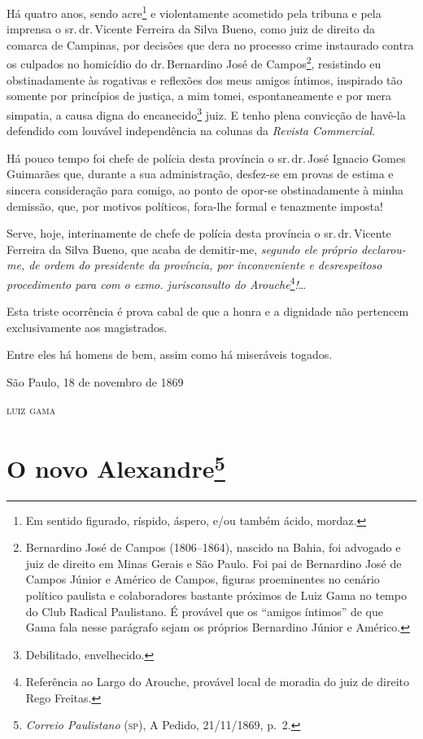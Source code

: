 Há quatro anos, sendo acre\footnote{Em sentido figurado, ríspido,
  áspero, e/ou também ácido, mordaz.} e violentamente acometido pela
tribuna e pela imprensa o sr.\,dr.\,Vicente Ferreira da Silva Bueno, como
juiz de direito da comarca de Campinas, por decisões que dera no
processo crime instaurado contra os culpados no homicídio do dr.\,Bernardino José de Campos\footnote{Bernardino José de Campos
  (1806--1864), nascido na Bahia, foi advogado e juiz de direito em Minas
  Gerais e São Paulo. Foi pai de Bernardino José de Campos Júnior e
  Américo de Campos, figuras proeminentes no cenário político paulista e
  colaboradores bastante próximos de Luiz Gama no tempo do Club Radical
  Paulistano. É provável que os ``amigos íntimos'' de que Gama fala nesse
  parágrafo sejam os próprios Bernardino Júnior e Américo.}, resistindo
eu obstinadamente às rogativas e reflexões dos meus amigos íntimos,
inspirado tão somente por princípios de justiça, a mim tomei,
espontaneamente e por mera simpatia, a causa digna do
encanecido\footnote{Debilitado, envelhecido.} juiz. E tenho plena
convicção de havê-la defendido com louvável independência na colunas da
\emph{Revista Commercial}.

Há pouco tempo foi chefe de polícia desta província o sr.\,dr.\,José
Ignacio Gomes Guimarães que, durante a sua administração, desfez-se em
provas de estima e sincera consideração para comigo, ao ponto de opor-se
obstinadamente à minha demissão, que, por motivos políticos, fora-lhe
formal e tenazmente imposta!

Serve, hoje, interinamente de chefe de polícia desta província o sr.\,dr.\,Vicente Ferreira da Silva Bueno, que acaba de demitir-me, \emph{segundo
ele próprio declarou-me, de ordem do presidente da província, por
inconveniente e desrespeitoso procedimento para com o exmo.
jurisconsulto do Arouche}\footnote{Referência ao Largo do Arouche,
  provável local de moradia do juiz de direito Rego Freitas.}\emph{!}\ldots{}

Esta triste ocorrência é prova cabal de que a honra e a dignidade não
pertencem exclusivamente aos magistrados.

Entre eles há homens de bem, assim como há miseráveis togados.

\begin{flushright}
São Paulo, 18 de novembro de 1869

\textsc{luiz gama}
\end{flushright}

\chapter{O novo Alexandre\footnote{\emph{Correio Paulistano} (\textsc{sp}), A
  Pedido, 21/11/1869, p.~2.}}

